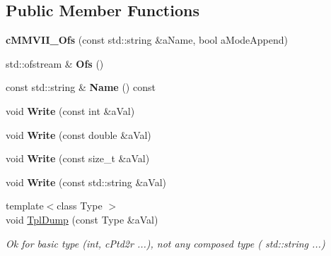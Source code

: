 \subsection*{Public Member Functions}
\begin{DoxyCompactItemize}
\item 
{\bfseries c\+M\+M\+V\+I\+I\+\_\+\+Ofs} (const std\+::string \&a\+Name, bool a\+Mode\+Append)\hypertarget{classMMVII_1_1cMMVII__Ofs_a1402a8135aa5f90f48e963391cc3eca1}{}\label{classMMVII_1_1cMMVII__Ofs_a1402a8135aa5f90f48e963391cc3eca1}

\item 
std\+::ofstream \& {\bfseries Ofs} ()\hypertarget{classMMVII_1_1cMMVII__Ofs_a6c8373a2ec6c4081a8d3dd67d0a83519}{}\label{classMMVII_1_1cMMVII__Ofs_a6c8373a2ec6c4081a8d3dd67d0a83519}

\item 
const std\+::string \& {\bfseries Name} () const \hypertarget{classMMVII_1_1cMMVII__Ofs_af1ba0852ea9b7d81a20f6b6f82ab26f2}{}\label{classMMVII_1_1cMMVII__Ofs_af1ba0852ea9b7d81a20f6b6f82ab26f2}

\item 
void {\bfseries Write} (const int \&a\+Val)\hypertarget{classMMVII_1_1cMMVII__Ofs_ac175d6d0b41779ed4ec981a031e8fdb1}{}\label{classMMVII_1_1cMMVII__Ofs_ac175d6d0b41779ed4ec981a031e8fdb1}

\item 
void {\bfseries Write} (const double \&a\+Val)\hypertarget{classMMVII_1_1cMMVII__Ofs_a70482ff35e9125e3b4d47025069de499}{}\label{classMMVII_1_1cMMVII__Ofs_a70482ff35e9125e3b4d47025069de499}

\item 
void {\bfseries Write} (const size\+\_\+t \&a\+Val)\hypertarget{classMMVII_1_1cMMVII__Ofs_aee9bab2629bdf72300e2f5eaf69ac5e5}{}\label{classMMVII_1_1cMMVII__Ofs_aee9bab2629bdf72300e2f5eaf69ac5e5}

\item 
void {\bfseries Write} (const std\+::string \&a\+Val)\hypertarget{classMMVII_1_1cMMVII__Ofs_a3ea6462aa97ed760967c14b01beb5f97}{}\label{classMMVII_1_1cMMVII__Ofs_a3ea6462aa97ed760967c14b01beb5f97}

\item 
{\footnotesize template$<$class Type $>$ }\\void \hyperlink{classMMVII_1_1cMMVII__Ofs_ab0f2e8e35ca6d61b50a1996c813084d1}{Tpl\+Dump} (const Type \&a\+Val)\hypertarget{classMMVII_1_1cMMVII__Ofs_ab0f2e8e35ca6d61b50a1996c813084d1}{}\label{classMMVII_1_1cMMVII__Ofs_ab0f2e8e35ca6d61b50a1996c813084d1}

\begin{DoxyCompactList}\small\item\em Ok for basic type (int, c\+Ptd2r ...), not any composed type ( std\+::string ...) \end{DoxyCompactList}\end{DoxyCompactItemize}
